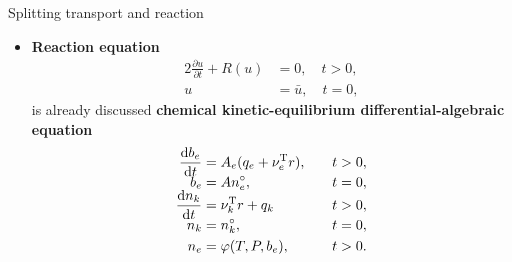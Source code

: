 %
%
\begin{frame}{Splitting transport and reaction}
	\begin{itemize}
		\item{\bf Reaction equation} 
		\begin{alignat*}{2}
			\frac{\partial u}{\partial t}+R(u) & = 0, \quad  t > 0, \\[-5pt]
			u & = \bar{u}, \quad  t = 0,
		\end{alignat*}
		is already discussed \alert{\bf chemical kinetic-equilibrium differential-algebraic equation}
		\begin{alignat*}{4}
			\frac{\mathrm{d}b_{e}}{\mathrm{d}t} & = A_{e}(q_{e}+\nu_{e}^{{\rm T}}r),  & \quad  &  t > 0, \\[-5pt]
			b_{e}  & = An_{e}^{\circ},       & \quad  & t = 0, \\[-5pt]
			\frac{\mathrm{d}n_{k}}{\mathrm{d}t} & =\nu_{k}^{{\rm T}}r+q_{k} &  \quad & t>0, \\[-5pt]
			n_{k}  & = n_{k}^{\circ},         & \quad  & t=0, \\
			n_{e}  & = \varphi(T,P,b_{e}), & \quad  &  t > 0.
		\end{alignat*} 
	\end{itemize}
\end{frame}
%
%
